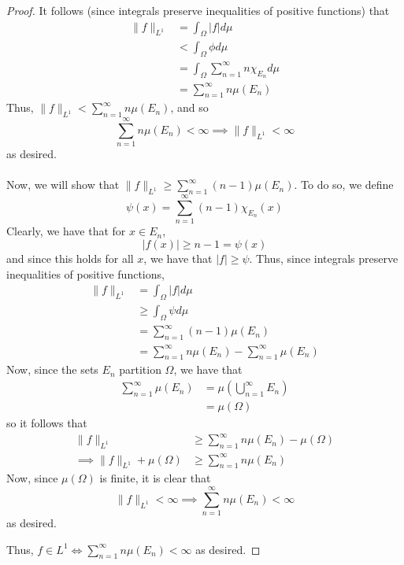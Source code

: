 \documentclass[fontsize=11pt]{scrartcl} %
\numberwithin{equation}{section} %
\numberwithin{figure}{section} %
\numberwithin{table}{section} %
\begin{document}
\begin{proof}
    It follows (since integrals preserve inequalities of positive functions)
    that
    \[
        \begin{aligned}
            \|f\|_{L^1} &= \int_{\Omega}|f|d\mu\\
                                &< \int_{\Omega}\phi d\mu\\
                                &=\int_{\Omega}\sum_{n=1}^{\infty}n\chi_{E_n}
                                d\mu\\
                                &=\sum_{n=1}^{\infty}n\mu(E_n)
        \end{aligned}
    \]
    Thus, $\|f\|_{L^1} < \sum_{n=1}^{\infty}n\mu(E_n)$, and so
    \[
        \sum_{n=1}^{\infty}n\mu(E_n) <\infty \implies \|f\|_{L^1}<\infty
    \]
    as desired.
    \\
    \\
    Now, we will show that $\|f\|_{L^1} \geq \sum_{n=1}^{\infty}(n-1)\mu(E_n)$.
    To do so, we define
    \[
        \psi(x) = \sum_{n=1}^{\infty}(n-1)\chi_{E_n}(x)
    \]
    Clearly, we have that for $x\in E_n$,
    \[
        |f(x)| \geq n-1 = \psi(x)
    \]
    and since this holds for all $x$, we have that $|f| \geq \psi$. Thus, since
    integrals preserve inequalities of positive functions,
    \[
        \begin{aligned}
            \|f\|_{L^1} &= \int_{\Omega}|f|d\mu\\
                        &\geq \int_{\Omega}\psi d\mu\\
                        &=\sum_{n=1}^{\infty}(n-1)\mu(E_n)\\
                        &=\sum_{n=1}^{\infty}n\mu(E_n) -
                        \sum_{n=1}^{\infty}\mu(E_n)
        \end{aligned}
    \]
    Now, since the sets $E_n$ partition $\Omega$, we have that
    \[
        \begin{aligned}
            \sum_{n=1}^{\infty}\mu(E_n) &=
            \mu\left(\bigcup_{n=1}^{\infty}E_n\right)\\
            &=\mu(\Omega)
        \end{aligned}
    \]
    so it follows that
    \[
        \begin{aligned}
            \|f\|_{L^1} &\geq \sum_{n=1}^{\infty}n\mu(E_n) - \mu(\Omega)\\
            \implies \|f\|_{L^1}+\mu(\Omega) &\geq \sum_{n=1}^{\infty}n\mu(E_n)
        \end{aligned}
    \]
    Now, since $\mu(\Omega)$ is finite, it is clear that
    \[
        \|f\|_{L^1} < \infty \implies \sum_{n=1}^{\infty}n\mu(E_n) < \infty
    \]
    as desired.

    Thus, $f\in L^1 \iff \sum_{n=1}^{\infty}n\mu(E_n) < \infty$ as desired.
\end{proof}
\end{document}
